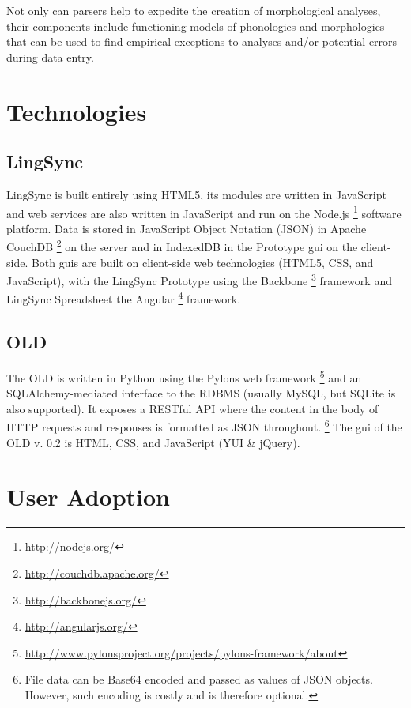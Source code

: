\documentclass[11pt]{article}
\begin{document}
Not only can parsers help to expedite the creation of morphological analyses,
their components include functioning models of phonologies and morphologies that
can be used to find empirical exceptions to analyses and/or potential errors
during data entry.




\section{Technologies}

\subsection{LingSync}

LingSync is built entirely using HTML5, its modules are written in JavaScript and web services are also written in JavaScript and run on the Node.js%
\footnote{\url{http://nodejs.org/}} %
software platform. Data is stored in JavaScript Object Notation (JSON) in Apache CouchDB%
\footnote{\url{http://couchdb.apache.org/}} %
on the server and in IndexedDB in the Prototype \gls{gui} on the client-side. Both \glspl{gui} are
built on client-side web technologies (HTML5, CSS, and JavaScript), with the LingSync
Prototype using the Backbone%
\footnote{\url{http://backbonejs.org/}} %
framework and LingSync Spreadsheet the Angular%
\footnote{\url{http://angularjs.org/}} %
framework.



\subsection{OLD}

The OLD is written in Python using the Pylons web framework%
\footnote{\url{http://www.pylonsproject.org/projects/pylons-framework/about}} %
and an SQLAlchemy-mediated interface to the RDBMS (usually MySQL, but SQLite is also
supported). It exposes a RESTful API where the content in the body of HTTP 
requests and responses is formatted as JSON throughout.%
\footnote{File data can be Base64 encoded and passed as values of JSON objects.
However, such encoding is costly and is therefore optional.} %
The \gls{gui} of the OLD v. 0.2 is HTML, CSS, and JavaScript (YUI \& jQuery).



\section{User Adoption}
\end{document}
